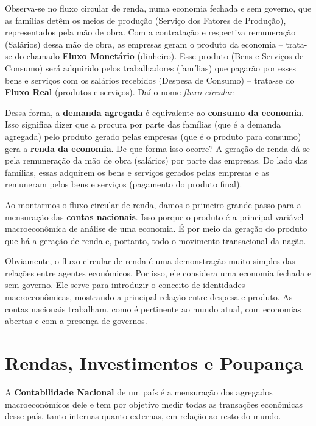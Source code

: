 \documentclass{article}\usepackage[]{graphicx}\usepackage[]{xcolor}
\begin{document}
Observa-se no fluxo circular de renda, numa economia fechada e sem governo, que as famílias detêm os meios de produção
(Serviço dos Fatores de Produção), representados pela mão de obra. Com a contratação e respectiva remuneração (Salários)
dessa mão de obra, as empresas geram o produto da economia -- trata-se do chamado \textbf{Fluxo Monetário} (dinheiro).
Esse produto (Bens e Serviços de Consumo) será adquirido pelos trabalhadores (famílias) que pagarão por esses bens e
serviços com os salários recebidos (Despesa de Consumo) -- trata-se do \textbf{Fluxo Real} (produtos e serviços).
Daí o nome \textit{fluxo circular}.\par

Dessa forma, a \textbf{demanda agregada} é equivalente ao \textbf{consumo da economia}.
Isso significa dizer que a procura por parte das famílias (que é a demanda agregada)
pelo produto gerado pelas empresas (que é o produto para consumo) gera a \textbf{renda da economia}.
De que forma isso ocorre? A geração de renda dá-se pela remuneração da mão de obra (salários)
por parte das empresas. Do lado das famílias, essas adquirem os bens e serviços
gerados pelas empresas e as remuneram pelos bens e serviços (pagamento do produto final).\par

Ao montarmos o fluxo circular de renda, damos o primeiro grande passo para a mensuração das \textbf{contas nacionais}.
Isso porque o produto é a principal variável macroeconômica de análise de uma economia. É por meio da geração do produto
que há a geração de renda e, portanto, todo o movimento transacional da nação.\par

Obviamente, o fluxo circular de renda é uma demonstração muito simples das relações entre agentes econômicos.
Por isso, ele considera uma economia fechada e sem governo. Ele serve para introduzir o conceito de identidades macroeconômicas,
mostrando a principal relação entre despesa e produto. As contas nacionais trabalham, como é pertinente ao mundo atual,
com economias abertas e com a presença de governos.\par

\section*{Rendas, Investimentos e Poupança}

A \textbf{Contabilidade Nacional} de um país é a mensuração dos agregados macroeconômicos dele e tem por objetivo
medir todas as transações econômicas desse país, tanto internas quanto externas, em relação ao resto do mundo.\par
\end{document}
